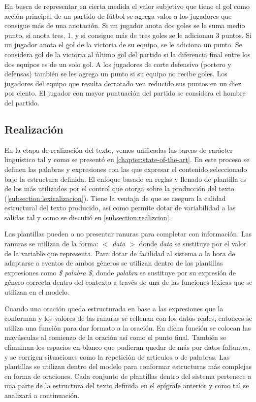     En busca de representar en cierta medida el valor subjetivo que tiene el gol como acción principal de un partido de fútbol se agrega valor a los jugadores que 
consigue más de una anotación. Si un jugador anota dos goles se le suma medio punto, si anota tres, 1, y si consigue más de tres goles se le adicionan 3 puntos. 
Si un jugador anota el gol de la victoria de su equipo, se le 
adiciona un punto.  Se considera gol de la victoria al último gol del partido si la diferencia final entre los dos equipos es de un solo gol. A los 
jugadores de corte defensivo (portero y defensas) también se les agrega un punto si su equipo no recibe goles. Los jugadores del equipo que resulta derrotado ven 
reducido sus puntos en un diez por ciento. El jugador con mayor puntuación del partido se considera el hombre del partido.



\subsection{Realización}

    En la etapa de realización del texto, vemos unificadas las tareas de carácter lingüístico tal y como se presentó en \ref{chapter:state-of-the-art}. 
En este proceso se definen las palabras y expresiones con las que expresar el contenido seleccionado bajo la estructura definida. El enfoque basado en reglas 
y llenado de plantilla es de los más utilizados por el control que otorga sobre la producción del texto (\ref{subsection:lexicalizacion}). Tiene la ventaja de que 
se asegura la calidad estructural del texto producido, así como permite dotar de variabilidad a las salidas tal y como se discutió en \ref{subsection:realizcion}.

    Las plantillas pueden o no presentar ranuras para completar con información. Las ranuras se utilizan de la forma: \textit{$<$ dato $>$} donde 
\textit{dato} se sustituye por el valor de la variable que representa. Para dotar de facilidad al sistema a la hora de adaptarse a eventos de 
ambos géneros se utilizan dentro de las plantillas expresiones como \textit{\$ palabra \$}, donde \textit{palabra} se sustituye por su expresión de 
género correcta dentro del contexto a través de una de las funciones léxicas que se utilizan en el modelo. 

    Cuando una oración queda estructurada en base a las expresiones que la conforman y los valores de las ranuras se rellenan con los datos reales, entonces 
se utiliza una función para dar formato a la oración. En dicha función se colocan las mayúsculas al comienzo de la oración así como el punto final. También se 
elimninan los espacios en blanco que pudieran quedar de más por datos faltantes, y se corrigen situaciones como la repetición de artículos o de palabras.
    Las plantillas se utilizan dentro del modelo para conformar estructuras más complejas en forma de 
oraciones. Cada conjunto de plantillas dentro del sistema pertenece a una parte de la estructura del texto definida en el ep\'igrafe anterior y como 
tal se analizará a continuación.\\

